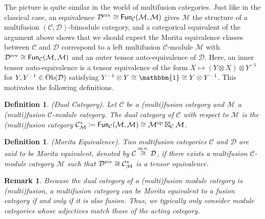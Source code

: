 \documentclass[12pt, reqno]{amsart}
\numberwithin{equation}{section}
\theoremstyle{plainspace}
\theoremstyle{definitionspace}
\newtheorem{definition}[theorem]{Definition}
\theoremstyle{remarkspace}
\newtheorem{remark}[theorem]{Remark}
\newcommand{\mathcat}[1]{\mathcal{#1}}
\newcommand{\Ob}{\textup{Ob}}
\newcommand{\Fun}[2][]{
	\ifthenelse{\equal{#2}{}}
		{\textcat{Fun}_{#1}}
		{\textcat{Fun}_{#1}\!\left(#2\right)}
}
\newcommand{\opcat}[1]{{#1}^{\textup{op}}}
\newcommand{\revcat}[1]{{#1}^{\textup{rev}}}
\newcommand{\textcat}[1]{\textup{\textsf{#1}}}
\newcommand{\moreq}{\stackrel{\textup{m.e.}}{\cong}}
\begin{document}
\noindent The picture is quite similar in the world of multifusion categories. Just like in the classical case, an equivalence $\revcat{\mathcat{D}} \cong \Fun[\mathcat{C}]{\mathcat{M}, \mathcat{M}}$ gives $\mathcat{M}$ the structure of a multifusion $(\mathcat{C}, \mathcat{D})$-bimodule category, and a categorical equivalent of the argument above shows that we should expect the Morita equivalence classes between $\mathcat{C}$ and $\mathcat{D}$ correspond to a left multifusion $\mathcat{C}$-module $\mathcat{M}$ with $\revcat{\mathcat{D}} \cong \Fun[\mathcat{C}]{\mathcat{M}, \mathcat{M}}$ and an outer tensor auto-equivalence of $\mathcat{D}$. Here, an inner tensor auto-equivalence is a tensor equivalence of the form $X \mapsto (Y \otimes X) \otimes Y^{-1}$ for $Y, Y^{-1} \in \Ob(\mathcat{D})$ satisfying $Y^{-1} \otimes Y \cong \mathbbm{1} \cong Y \otimes Y^{-1}$. This motivates the following definitions.
\newline

\begin{definition}\label{def:dual_category}{\em (Dual Category).} \cite[Definition 7.12.2]{Etingof_2016}
Let $\mathcat{C}$ be a (multi)fusion category and $\mathcat{M}$ a (multi)fusion $\mathcat{C}$-module category. The {\em dual category} of $\mathcat{C}$ with respect to $\mathcat{M}$ is the (multi)fusion category $\mathcat{C}_{\mathcat{M}}^{*} \coloneqq \Fun[\mathcat{C}]{\mathcat{M}, \mathcat{M}} \cong \opcat{\mathcat{M}} \boxtimes_{\mathcat{C}} \mathcat{M}$.
\end{definition}
\leavevmode

\begin{definition}\label{def:morita_equivalence}{\em (Morita Equivalence).} \cite[Definition 7.12.17]{Etingof_2016}
Two multifusion categories $\mathcat{C}$ and $\mathcat{D}$ are said to be {\em Morita equivalent}, denoted by $\mathcat{C} \moreq \mathcat{D}$, if there exists a multifusion $\mathcat{C}$-module category $\mathcat{M}$ such that $\revcat{\mathcat{D}} \cong \mathcat{C}_{\mathcat{M}}^{*}$ is a tensor equivalence.
\end{definition}
\leavevmode

\begin{remark}\label{rem:morita_equivalence_adjectives}
Because the dual category of a (multi)fusion module category is (multi)fusion, a multifusion category can be Morita equivalent to a fusion category if and only if it is also fusion. Thus, we typically only consider module categories whose adjectives match those of the acting category.
\end{remark}
\leavevmode\newline
\end{document}
